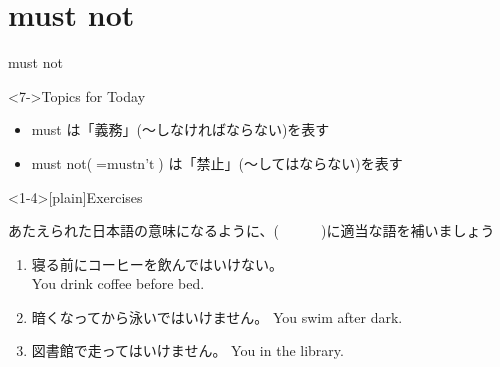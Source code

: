 \documentclass[aspectratio=169,xcolor={dvipsnames,table}]{beamer}
\newcommand{\myaudio}[1]{\href{#1}{\faVolumeUp}}
\begin{document}
\section{must not}
\begin{frame}[plain]{must not}
 
\Large


\vspace{-10pt}
\mbox{}\hfill{}



 \hfill{}

\hfill{{\scriptsize \myaudio{./audio/013_must_04.mp3}}}

\vfill

\begin{exampleblock}<7->{Topics for Today}
\begin{itemize}[square]\small
 \item must は「義務」(〜しなければならない)を表す
 \item must not($=\text{mustn't}$) は「禁止」(〜してはならない)を表す
 \end{itemize}
     \end{exampleblock}

\end{frame}
\begin{frame}<1-4>[plain]{Exercises}
 
あたえられた日本語の意味になるように、(~~~~~~)に適当な語を補いましょう
\hfill{\myaudio{./audio/013_must_05.mp3}}


\begin{enumerate}
 \item 寝る前にコーヒーを飲んではいけない。\\
You  drink coffee before bed.
 \item 暗くなってから泳いではいけません。 You  swim after dark.
 \item 図書館で走ってはいけません。 You   in the library.
\end{enumerate}
\end{frame}
\end{document}
